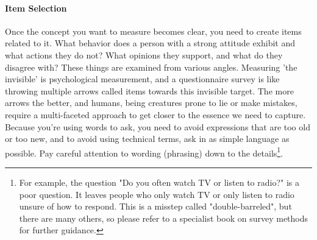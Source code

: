 \documentclass{ltjsbook}
\begin{document}
\paragraph{Item Selection} Once the concept you want to measure becomes clear, you need to create items related to it. What behavior does a person with a strong attitude exhibit and what actions they do not? What opinions they support, and what do they disagree with? These things are examined from various angles. Measuring 'the invisible' is psychological measurement, and a questionnaire survey is like throwing multiple arrows called items towards this invisible target. The more arrows the better, and humans, being creatures prone to lie or make mistakes, require a multi-faceted approach to get closer to the essence we need to capture. Because you're using words to ask, you need to avoid expressions that are too old or too new, and to avoid using technical terms, ask in as simple language as possible. Pay careful attention to wording (phrasing) down to the details\footnote{For example, the question "Do you often watch TV or listen to radio?" is a poor question. It leaves people who only watch TV or only listen to radio unsure of how to respond. This is a misstep called "double-barreled", but there are many others, so please refer to a specialist book on survey methods for further guidance.}.

\end{document}
